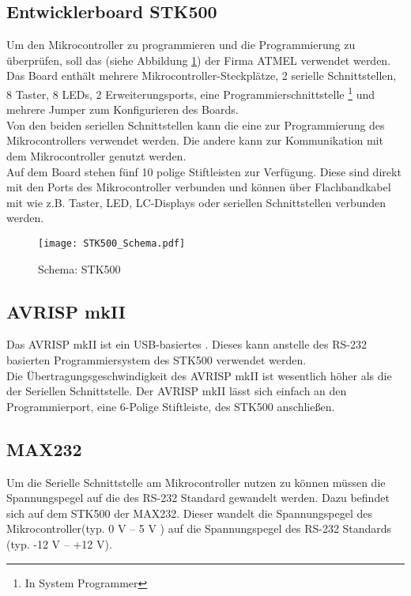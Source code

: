 \subsection{Entwicklerboard STK500}
Um den Mikrocontroller zu programmieren und die Programmierung zu überprüfen, soll das (siehe Abbildung \ref{fig:STK500}) der Firma ATMEL verwendet werden. Das Board enthält mehrere Mikrocontroller-Steckplätze, 2 serielle Schnittstellen, 8 Taster, 8 LEDs, 2 Erweiterungsports, eine Programmierschnittstelle \footnote{In System Programmer} und mehrere Jumper zum Konfigurieren des Boards.\\
Von den beiden seriellen Schnittstellen kann die eine zur Programmierung des Mikrocontrollers verwendet werden. Die andere kann zur Kommunikation mit dem Mikrocontroller genutzt werden.\\
Auf dem Board stehen fünf 10 polige Stiftleisten 
zur Verfügung. Diese sind direkt mit den Ports des Mikrocontroller verbunden und können über Flachbandkabel mit  wie z.B. Taster, LED, LC-Displays oder seriellen Schnittstellen verbunden werden.
\begin{figure}[htb]
\centering
\texttt{[image: STK500\_Schema.pdf]}
\caption{Schema: STK500}
\label{fig:STK500}
\citep{atmel:ug_STK500}
\end{figure}

\subsection{AVRISP mkII}
Das AVRISP mkII ist ein USB-basiertes . Dieses kann anstelle des RS-232 basierten Programmiersystem des STK500 verwendet werden.\\
Die Übertragungsgeschwindigkeit des AVRISP mkII ist wesentlich höher als die der Seriellen Schnittstelle. 
Der AVRISP mkII lässt sich einfach an den Programmierport, eine 6-Polige Stiftleiste, des STK500 anschließen.

\subsection{MAX232}
Um die Serielle Schnittstelle am Mikrocontroller nutzen zu können müssen die Spannungspegel auf die des RS-232 Standard gewandelt werden. Dazu befindet sich auf dem STK500 der  MAX232. 
Dieser wandelt die Spannungspegel des Mikrocontroller(typ. 0 V -- 5 V ) auf die Spannungspegel des RS-232 Standards (typ. -12 V -- +12 V).

